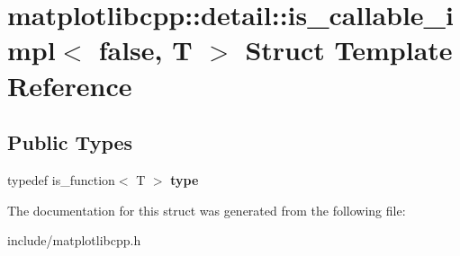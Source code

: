 \hypertarget{structmatplotlibcpp_1_1detail_1_1is__callable__impl_3_01false_00_01T_01_4}{}\section{matplotlibcpp\+:\+:detail\+:\+:is\+\_\+callable\+\_\+impl$<$ false, T $>$ Struct Template Reference}
\label{structmatplotlibcpp_1_1detail_1_1is__callable__impl_3_01false_00_01T_01_4}
\subsection*{Public Types}
\begin{DoxyCompactItemize}
\item 
typedef is\+\_\+function$<$ T $>$ {\bfseries type}\hypertarget{structmatplotlibcpp_1_1detail_1_1is__callable__impl_3_01false_00_01T_01_4_a54b64329bf2f22cd03b8914d0bf47c3c}{}\label{structmatplotlibcpp_1_1detail_1_1is__callable__impl_3_01false_00_01T_01_4_a54b64329bf2f22cd03b8914d0bf47c3c}

\end{DoxyCompactItemize}


The documentation for this struct was generated from the following file\+:\begin{DoxyCompactItemize}
\item 
include/matplotlibcpp.\+h\end{DoxyCompactItemize}
